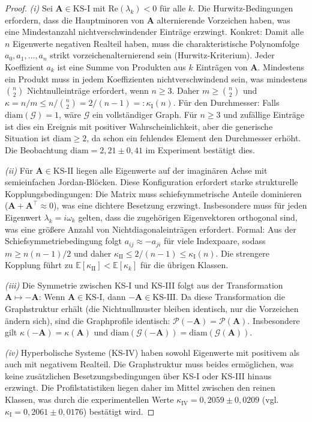 ﻿\documentclass[12pt, a4paper, titlepage]{report}
\theoremstyle{definition}
\theoremstyle{remark}
\newcommand{\vA}{\bm{A}}
\newcommand{\T}{\top}
\newcommand{\re}{\mathrm{Re}}
\newcommand{\KS}{\mathrm{KS}}
\begin{document}
\begin{proof}
\textit{(i)} Sei $\vA \in \KS\text{-I}$ mit $\re(\lambda_k) < 0$ für alle $k$.
Die Hurwitz-Bedingungen erfordern, dass die Hauptminoren von $\vA$ alternierende
Vorzeichen haben, was eine Mindestanzahl nichtverschwindender Einträge erzwingt.
Konkret: Damit alle $n$ Eigenwerte negativen Realteil haben, muss die charakteristische
Polynomfolge $a_0, a_1, \ldots, a_n$ strikt vorzeichenalternierend sein (Hurwitz-Kriterium).
Jeder Koeffizient $a_k$ ist eine Summe von Produkten aus $k$ Einträgen von $\vA$.
Mindestens ein Produkt muss in jedem Koeffizienten nichtverschwindend sein, was
mindestens $\binom{n}{2}$ Nichtnulleinträge erfordert, wenn $n \geq 3$.
Daher $m \geq \binom{n}{2}$ und $\kappa = n/m \leq n/\binom{n}{2} = 2/(n-1) =:
\kappa_{\mathrm{I}}(n)$.
Für den Durchmesser: Falls $\mathrm{diam}(\mathcal{G}) = 1$, wäre $\mathcal{G}$
ein vollständiger Graph. Für $n \geq 3$ und zufällige Einträge ist dies ein
Ereignis mit positiver Wahrscheinlichkeit, aber die generische Situation ist
$\mathrm{diam} \geq 2$, da schon ein fehlendes Element den Durchmesser erhöht.
Die Beobachtung $\mathrm{diam} = 2{,}21 \pm 0{,}41$ im Experiment bestätigt dies.

\textit{(ii)} Für $\vA \in \KS\text{-II}$ liegen alle Eigenwerte auf der imaginären
Achse mit semieinfachen Jordan-Blöcken. Diese Konfiguration erfordert starke strukturelle
Kopplungsbedingungen: Die Matrix muss schiefsymmetrische Anteile dominieren
($\vA + \vA^\T \approx 0$), was eine dichtere Besetzung erzwingt. Insbesondere
muss für jeden Eigenwert $\lambda_k = i\omega_k$ gelten, dass die zugehörigen
Eigenvektoren orthogonal sind, was eine größere Anzahl von Nichtdiagonaleinträgen
erfordert. Formal: Aus der Schiefsymmetriebedingung folgt $a_{ij} \approx -a_{ji}$
für viele Indexpaare, sodass $m \geq n(n-1)/2$ und daher
$\kappa_{\mathrm{II}} \leq 2/(n-1) \leq \kappa_{\mathrm{I}}(n)$.
Die strengere Kopplung führt zu $\mathbb{E}[\kappa_{\mathrm{II}}] < \mathbb{E}[\kappa_k]$
für die übrigen Klassen.

\textit{(iii)} Die Symmetrie zwischen KS-I und KS-III folgt aus der Transformation
$\vA \mapsto -\vA$: Wenn $\vA \in \KS\text{-I}$, dann $-\vA \in \KS\text{-III}$.
Da diese Transformation die Graphstruktur erhält (die Nichtnullmuster bleiben identisch,
nur die Vorzeichen ändern sich), sind die Graphprofile identisch:
$\mathcal{P}(-\vA) = \mathcal{P}(\vA)$. Insbesondere gilt
$\kappa(-\vA) = \kappa(\vA)$ und $\mathrm{diam}(\mathcal{G}(-\vA)) =
\mathrm{diam}(\mathcal{G}(\vA))$.

\textit{(iv)} Hyperbolische Systeme (KS-IV) haben sowohl Eigenwerte mit positivem als
auch mit negativem Realteil. Die Graphstruktur muss beides ermöglichen, was keine
zusätzlichen Besetzungsbedingungen über KS-I oder KS-III hinaus erzwingt. Die
Profilstatistiken liegen daher im Mittel zwischen den reinen Klassen, was durch
die experimentellen Werte $\kappa_{\mathrm{IV}} = 0{,}2059 \pm 0{,}0209$
(vgl.\ $\kappa_{\mathrm{I}} = 0{,}2061 \pm 0{,}0176$) bestätigt wird.
\end{proof}
\end{document}
